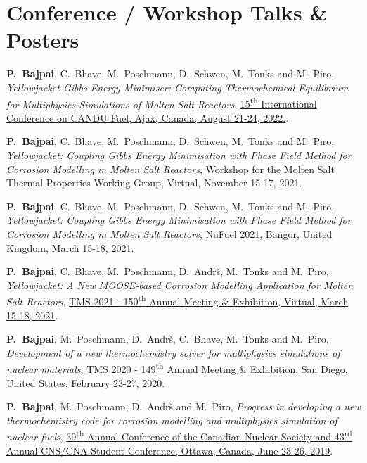 {\section*{Conference / Workshop Talks \& Posters}
\vspace*{1em}
\begin{enumerate}{\small\compresslist
    \item \textbf{P.\ Bajpai}, {C.\ Bhave}, {M.\ Poschmann}, {D.\ Schwen}, {M.\ Tonks} and {M.\ Piro}, \textit{Yellowjacket Gibbs Energy Minimiser: Computing Thermochemical Equilibrium for Multiphysics Simulations of Molten Salt Reactors}, \href{https://www.cns-snc.ca/event/2022-fuel-conference/}{15\textsuperscript{th} International Conference on CANDU Fuel, Ajax, Canada, August 21-24, 2022.}.
    \item \textbf{P.\ Bajpai}, {C.\ Bhave}, {M.\ Poschmann}, {D.\ Schwen}, {M.\ Tonks} and {M.\ Piro}, \textit{Yellowjacket: Coupling Gibbs Energy Minimisation with Phase Field Method for Corrosion Modelling in Molten Salt Reactors}, {Workshop for the Molten Salt Thermal Properties Working Group, Virtual, November 15-17, 2021}.
    \item \textbf{P.\ Bajpai}, {C.\ Bhave}, {M.\ Poschmann}, {D.\ Schwen}, {M.\ Tonks} and {M.\ Piro}, \textit{Yellowjacket: Coupling Gibbs Energy Minimisation with Phase Field Method for Corrosion Modelling in Molten Salt Reactors}, \href{https://nubu.nu/events/nufuel-workshop/}{NuFuel 2021, Bangor, United Kingdom, March 15-18, 2021}.
    \item \textbf{P.\ Bajpai}, {C.\ Bhave}, {M.\ Poschmann}, {D.\ Andr\v{s}}, {M.\ Tonks} and {M.\ Piro}, \textit{Yellowjacket: A New MOOSE‐based Corrosion Modelling Application for Molten Salt Reactors}, \href{https://www.tms.org/TMS2021}{TMS 2021  - 150\textsuperscript{th} Annual Meeting \& Exhibition, Virtual, March 15-18, 2021}.
    \item \textbf{P.\ Bajpai}, {M.\ Poschmann}, {D.\ Andr\v{s}}, {C.\ Bhave}, {M.\ Tonks} and {M.\ Piro}, \textit{Development of a new thermochemistry solver for multiphysics simulations of nuclear materials}, \href{https://www.tms.org/TMS2020}{TMS 2020  - 149\textsuperscript{th} Annual Meeting \& Exhibition, San Diego, United States, February 23-27, 2020}.
    \item \textbf{P.\ Bajpai}, {M.\ Poschmann}, {D.\ Andr\v{s}} and {M.\ Piro}, \textit{Progress in developing a new thermochemistry code for corrosion modelling and multiphysics simulation of nuclear fuels}, \href{http://cns-annual-conference.org/2019/index.html}{39\textsuperscript{th} Annual Conference of the Canadian Nuclear Society and 43\textsuperscript{rd} Annual CNS/CNA Student Conference, Ottawa, Canada, June 23-26, 2019}.
}
\end{enumerate}


}
